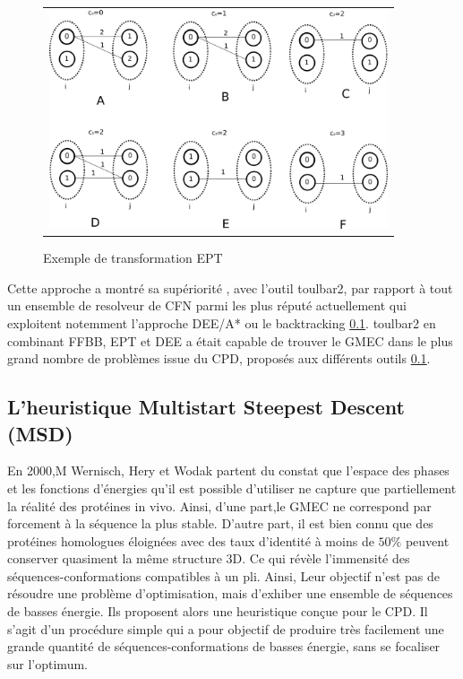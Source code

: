 \begin{figure}[!htbp]
  \centering
  \begin{tabular}{c}
    \includegraphics[width=10cm]{figure/coherences_local.png} \\
  \end{tabular}
  \caption{Exemple de transformation EPT}
  \label{EPT}
\end{figure}




Cette approche a montré sa supériorité , avec l'outil toulbar2, par rapport à tout un ensemble de resolveur de CFN parmi les plus réputé actuellement qui exploitent notemment l'approche DEE/A* ou le backtracking \ref{}. toulbar2 en combinant FFBB, EPT et DEE a était capable de trouver le GMEC dans le plus grand nombre de problèmes issue du CPD, proposés aux différents outils \ref{}.

\subsection{L'heuristique Multistart Steepest Descent (MSD)}

En 2000,M Wernisch, Hery et Wodak partent du constat que l'espace des phases et les fonctions d'énergies qu'il est possible d'utiliser ne capture que partiellement la réalité des protéines in vivo. Ainsi, d'une part,le GMEC ne correspond par forcement à la séquence la plus stable. D'autre part, il est bien connu que des protéines homologues éloignées avec des taux d'identité à moins de $50\%$ peuvent conserver quasiment la même structure 3D. Ce qui révèle l'immensité des séquences-conformations compatibles à un pli. Ainsi, Leur objectif n'est pas de résoudre une problème d'optimisation, mais d'exhiber une ensemble de séquences de basses énergie. Ils proposent alors une heuristique conçue pour le CPD. Il s'agit d'un procédure simple qui a pour objectif de produire très facilement une grande quantité de séquences-conformations de basses énergie, sans se focaliser sur l'optimum.

